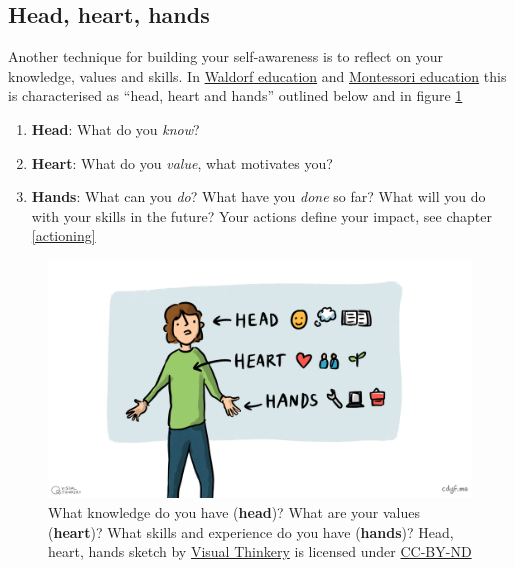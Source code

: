\documentclass[
]{book}
\providecommand{\tightlist}{%
  \setlength{\itemsep}{0pt}\setlength{\parskip}{0pt}}
\begin{document}
\hypertarget{hhh}{%
\subsection{Head, heart, hands}\label{hhh}}

Another technique for building your self-awareness is to reflect on your knowledge, values and skills. In \href{https://en.wikipedia.org/wiki/Waldorf_education}{Waldorf education} and \href{https://en.wikipedia.org/wiki/Montessori_education}{Montessori education} this is characterised as ``head, heart and hands'' outlined below and in figure \ref{fig:headhearthands-fig} \citep{headhearthands}

\begin{enumerate}
\def\labelenumi{\arabic{enumi}.}
\tightlist
\item
  \textbf{Head}: What do you \emph{know}?
\item
  \textbf{Heart}: What do you \emph{value}, what motivates you?
\item
  \textbf{Hands}: What can you \emph{do}? What have you \emph{done} so far? What will you do with your skills in the future? Your actions define your impact, see chapter \ref{actioning}
\end{enumerate}

\begin{figure}

{\centering \includegraphics[width=1\linewidth]{images/Head, heart and hands} 

}

\caption{What knowledge do you have (\textbf{head})? What are your values (\textbf{heart})? What skills and experience do you have (\textbf{hands})? Head, heart, hands sketch by \href{https://visualthinkery.com/}{Visual Thinkery} is licensed under \href{https://creativecommons.org/licenses/by-nd/4.0/}{CC-BY-ND}}\label{fig:headhearthands-fig}
\end{figure}
\end{document}
